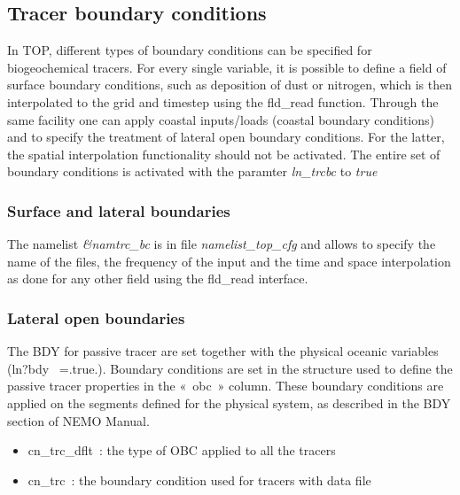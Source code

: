 \documentclass[../main/TOP_manual]{subfiles}
\begin{document}

\subsection{Tracer boundary conditions}

In TOP, different types of boundary conditions can be specified for biogeochemical tracers. For every single variable, it is possible to define a field of surface boundary conditions, such as deposition of dust or nitrogen, which is then interpolated to the grid and timestep using the fld\_read function. Through the same facility one can apply coastal inputs/loads (coastal boundary conditions) and to specify the treatment of lateral open boundary conditions. For the latter, the spatial interpolation functionality should not be activated. The entire set of boundary conditions is activated with the paramter \textit{ln\_trcbc} to \textit{true}


\subsubsection{Surface and lateral boundaries}

The namelist \textit{\&namtrc\_bc}  is in file \textit{namelist\_top\_cfg}  and allows to specify the name of the files, the frequency of the input and the time and space interpolation as done for any other field using the fld\_read interface.

\subsubsection{Lateral open boundaries}

The BDY for passive tracer are set together with the physical oceanic variables (ln?bdy  =.true.). Boundary conditions are set in the structure used to define the passive tracer properties in the « obc » column. These boundary conditions are applied on the segments defined for the physical system, as described in the BDY section of NEMO Manual.
\begin{itemize}
	\item cn\_trc\_dflt : the type of OBC applied to all the tracers
	\item cn\_trc :  the boundary condition used for tracers with data file
\end{itemize} 
\end{document}
